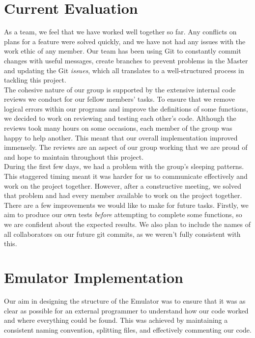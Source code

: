 \documentclass[10pt]{article}
\begin{document}
\section*{Current Evaluation}
As a team, we feel that we have worked well together so far. Any conflicts on plans for a feature were solved quickly, and we have not had any issues with the work ethic of any member. Our team has been using Git to constantly commit changes with useful messages, create branches to prevent problems in the Master and updating the Git \textsl{issues}, which all translates to a well-structured process in tackling this project.
\\

The cohesive nature of our group is supported by the extensive internal code reviews we conduct for our fellow members’ tasks. To ensure that we remove logical errors within our programs and improve the definitions of some functions, we decided to work on reviewing and testing each other’s code. Although the reviews took many hours on some occasions, each member of the group was happy to help another. This meant that our overall implementation improved immensely. The reviews are an aspect of our group working that we are proud of and hope to maintain throughout this project.
\\

During the first few days, we had a problem with the group's sleeping patterns. This staggered timing meant it was harder for us to communicate effectively and work on the project together. However, after a constructive meeting, we solved that problem and had every member available to work on the project together.
\\

There are a few improvements we would like to make for future tasks. Firstly, we aim to produce our own tests \textsl{before} attempting to complete some functions, so we are confident about the expected results. We also plan to include the names of all collaborators on our future git commits, as we weren't fully consistent with this.  

\section*{Emulator Implementation}
Our aim in designing the structure of the Emulator was to ensure that it was as clear as possible for an external programmer to understand how our code worked and where everything could be found. This was achieved by maintaining a consistent naming convention, splitting files, and effectively commenting our code.
\end{document}
